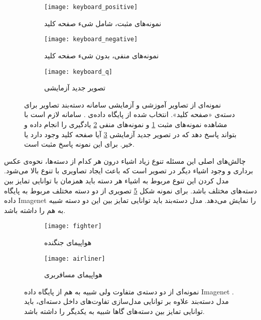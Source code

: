 \documentclass[11pt]{article}
\begin{document}
\begin{figure}[b!]
	\centering
	\begin{subfigure}[h]{0.5\textwidth}
		\texttt{[image: keyboard\_positive]}
		\caption{نمونه‌های مثبت، شامل شی‌ء صفحه کلید}
		\label{fig:intro:img_class_data:train_pos}
	\end{subfigure}
	\begin{subfigure}[h]{0.5\textwidth}
		\texttt{[image: keyboard\_negative]}
		\caption{نمونه‌های منفی، بدون شی‌ء صفحه کلید}
		\label{fig:intro:img_class_data:train_neg}
	\end{subfigure}
	\begin{subfigure}[h]{0.5\textwidth}
		\centering
		\texttt{[image: keyboard\_q]}
		\caption{تصویر جدید آزمایشی}
		\label{fig:intro:img_class_data:query}
	\end{subfigure}
 
	\caption{‌نمونه‌ای از تصاویر آموزشی و آزمایشی سامانه دسته‌بند تصاویر برای دسته‌ی «صفحه کلید». انتخاب شده از پایگاه داده‌ی
 \cite{caltech256}.
			سامانه لازم است با مشاهده نمونه‌های مثبت \ref{fig:intro:img_class_data:train_pos} و نمونه‌های منفی \ref{fig:intro:img_class_data:train_neg} یادگیری را انجام داده و بتواند پاسخ دهد که در تصویر جدید آزمایشی \ref{fig:intro:img_class_data:query} آیا صفحه کلید وجود دارد یا خیر. برای این نمونه پاسخ مثبت است.
			}
	\label{fig:intro:img_class_data}
\end{figure}
چالش‌های اصلی این مسئله تنوع زیاد اشیاء درون هر کدام از دسته‌ها، نحوه‌ی عکس برداری و وجود اشیاء دیگر در تصویر است که باعث ایجاد تصاویری با تنوع بالا می‌شود. مدل کردن این تنوع مربوط به اشیاء هر دسته باید همزمان با توانایی تمایز بین دسته‌های مختلف باشد. برای نمونه شکل
\ref{fig:intro:img_class_discrim}
تصویری از دو دسته مختلف مربوط به پایگاه داده
Imagenet \cite{imagenet}
را نمایش می‌دهد. مدل دسته‌بند باید توانایی تمایز بین این دو دسته شبیه به هم را داشته باشد.

\begin{figure}[t]
	\centering
	\begin{subfigure}[h]{0.35\textwidth}
		\centering
		\texttt{[image: fighter]}
		\caption{هواپیمای جنگنده}
	\end{subfigure}
	\begin{subfigure}[h]{0.35\textwidth}
		\centering
		\texttt{[image: airliner]}
		\caption{هواپیمای مسافربری}
	\end{subfigure}
	\caption{نمونه‌ای از دو دسته‌ی متفاوت ولی شبیه به هم از پایگاه داده
Imagenet \cite{imagenet}.
مدل دسته‌بند علاوه بر توانایی مدل‌سازی تفاوت‌های داخل دسته‌ای، باید توانایی تمایز بین دسته‌های گاها شبیه به یکدیگر را داشته باشد.
}
	\label{fig:intro:img_class_discrim}
\end{figure}
\end{document}
